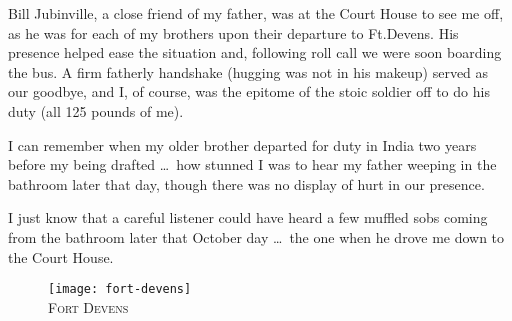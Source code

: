\documentclass[../m3y]{subfiles}
\begin{document}
Bill Jubinville, a close friend of my father, was at the Court House to see me off, as he was for each of my brothers upon their departure to Ft.\@ Devens. His presence helped ease the situation and, following roll call we were soon boarding the bus. A firm fatherly handshake (hugging was not in his makeup) served as our goodbye, and I, of course, was the epitome of the stoic soldier off to do his duty (all 125 pounds of me).

I can remember when my older brother departed for duty in India two years before my being drafted \ldots\ how stunned I was to hear my father weeping in the bathroom later that day, though there was no display of hurt in our presence.

I just know that a careful listener could have heard a few muffled sobs coming from the bathroom later that October day \ldots\ the one when he drove me down to the Court House.

\begin{figure}
\centering
\texttt{[image: fort-devens]}\\
\medskip
{\newtimes\textsc{Fort Devens}}
\end{figure}
\end{document}
